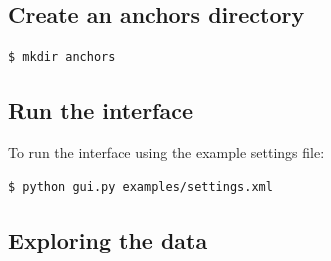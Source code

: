 \documentclass[12pt]{article}
\begin{document}
\subsection{Create an anchors directory}
\begin{verbatim}
$ mkdir anchors
\end{verbatim}

\subsection{Run the interface}
To run the interface using the example settings file:

\begin{verbatim}
$ python gui.py examples/settings.xml
\end{verbatim}

\subsection{Exploring the data}
\end{document}
